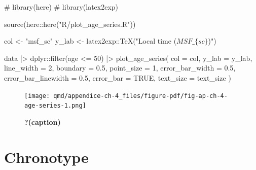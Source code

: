 \documentclass[
  12pt,
  a4paper,
  oneside]{tesesusp}
\newenvironment{Shaded}{\begin{snugshade}}{\end{snugshade}}
\newcommand{\AttributeTok}[1]{\textcolor[rgb]{0.40,0.45,0.13}{#1}}
\newcommand{\CommentTok}[1]{\textcolor[rgb]{0.37,0.37,0.37}{#1}}
\newcommand{\ConstantTok}[1]{\textcolor[rgb]{0.56,0.35,0.01}{#1}}
\newcommand{\DecValTok}[1]{\textcolor[rgb]{0.68,0.00,0.00}{#1}}
\newcommand{\FloatTok}[1]{\textcolor[rgb]{0.68,0.00,0.00}{#1}}
\newcommand{\FunctionTok}[1]{\textcolor[rgb]{0.28,0.35,0.67}{#1}}
\newcommand{\NormalTok}[1]{\textcolor[rgb]{0.00,0.23,0.31}{#1}}
\newcommand{\OtherTok}[1]{\textcolor[rgb]{0.00,0.23,0.31}{#1}}
\newcommand{\SpecialCharTok}[1]{\textcolor[rgb]{0.37,0.37,0.37}{#1}}
\newcommand{\StringTok}[1]{\textcolor[rgb]{0.13,0.47,0.30}{#1}}
\begin{document}
\begin{Shaded}
\begin{Highlighting}[numbers=left,,]
\CommentTok{\# library(here)}
\CommentTok{\# library(latex2exp)}

\FunctionTok{source}\NormalTok{(here}\SpecialCharTok{::}\FunctionTok{here}\NormalTok{(}\StringTok{"R/plot\_age\_series.R"}\NormalTok{))}

\NormalTok{col }\OtherTok{\textless{}{-}} \StringTok{"msf\_sc"}
\NormalTok{y\_lab }\OtherTok{\textless{}{-}}\NormalTok{ latex2exp}\SpecialCharTok{::}\FunctionTok{TeX}\NormalTok{(}\StringTok{"Local time ($MSF\_\{sc\}$)"}\NormalTok{)}

\NormalTok{data }\SpecialCharTok{|\textgreater{}}
\NormalTok{  dplyr}\SpecialCharTok{::}\FunctionTok{filter}\NormalTok{(age }\SpecialCharTok{\textless{}=} \DecValTok{50}\NormalTok{) }\SpecialCharTok{|\textgreater{}}
  \FunctionTok{plot\_age\_series}\NormalTok{(}
    \AttributeTok{col =}\NormalTok{ col, }
    \AttributeTok{y\_lab =}\NormalTok{ y\_lab, }
    \AttributeTok{line\_width =} \DecValTok{2}\NormalTok{, }
    \AttributeTok{boundary =} \FloatTok{0.5}\NormalTok{, }
    \AttributeTok{point\_size =} \DecValTok{1}\NormalTok{,}
    \AttributeTok{error\_bar\_width =} \FloatTok{0.5}\NormalTok{, }
    \AttributeTok{error\_bar\_linewidth =} \FloatTok{0.5}\NormalTok{, }
    \AttributeTok{error\_bar =} \ConstantTok{TRUE}\NormalTok{,}
    \AttributeTok{text\_size =}\NormalTok{ text\_size}
\NormalTok{    )}
\end{Highlighting}
\end{Shaded}

\begin{figure}[H]

\caption{\label{fig-ap-ch-4-age-series}\textbf{?(caption)}}

{\centering \texttt{[image: qmd/appendice-ch-4\_files/figure-pdf/fig-ap-ch-4-age-series-1.png]}

}

\end{figure}

\hypertarget{chronotype}{%
\section{Chronotype}\label{chronotype}}
\end{document}
